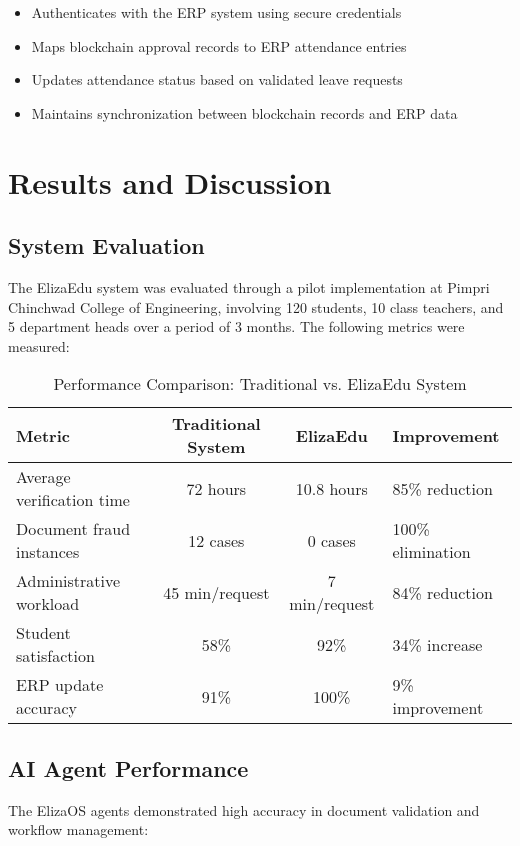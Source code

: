 \documentclass[a4paper,12pt]{article}
\begin{document}
\begin{itemize}
    \item Authenticates with the ERP system using secure credentials
    \item Maps blockchain approval records to ERP attendance entries
    \item Updates attendance status based on validated leave requests
    \item Maintains synchronization between blockchain records and ERP data
\end{itemize}

\section{Results and Discussion}
\subsection{System Evaluation}
The ElizaEdu system was evaluated through a pilot implementation at Pimpri Chinchwad College of Engineering, involving 120 students, 10 class teachers, and 5 department heads over a period of 3 months. The following metrics were measured:

\begin{table}[H]
\centering
\caption{Performance Comparison: Traditional vs. ElizaEdu System}
\begin{tabular}{|l|c|c|p{3cm}|}
\hline
\textbf{Metric} & \textbf{Traditional System} & \textbf{ElizaEdu} & \textbf{Improvement} \\
\hline
Average verification time & 72 hours & 10.8 hours & 85\% reduction \\
\hline
Document fraud instances & 12 cases & 0 cases & 100\% elimination \\
\hline
Administrative workload & 45 min/request & 7 min/request & 84\% reduction \\
\hline
Student satisfaction & 58\% & 92\% & 34\% increase \\
\hline
ERP update accuracy & 91\% & 100\% & 9\% improvement \\
\hline
\end{tabular}
\end{table}

\subsection{AI Agent Performance}
The ElizaOS agents demonstrated high accuracy in document validation and workflow management:
\end{document}
